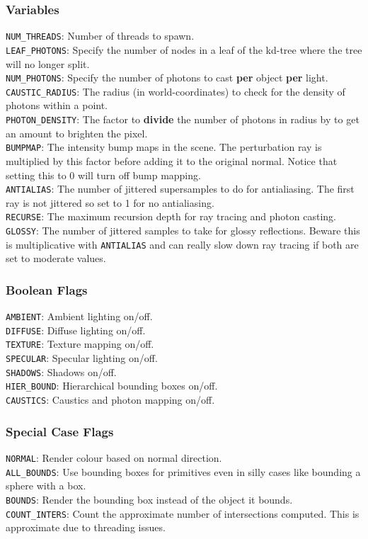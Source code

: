 \documentclass {article}
\begin{document}
\subsubsection{Variables}
\verb!NUM_THREADS!: Number of threads to spawn.\\
\verb!LEAF_PHOTONS!: Specify the number of nodes in a leaf of the kd-tree
where the tree will no longer split.\\
\verb!NUM_PHOTONS!: Specify the number of photons to cast \textbf{per} object
\textbf{per} light.\\
\verb!CAUSTIC_RADIUS!: The radius (in world-coordinates) to check for the
density of photons within a point.\\
\verb!PHOTON_DENSITY!: The factor to \textbf{divide} the number of photons in
radius by to get an amount to brighten the pixel.\\
\verb!BUMPMAP!: The intensity bump maps in the scene.  The perturbation ray is
multiplied by this factor before adding it to the original normal.  Notice that
setting this to 0 will turn off bump mapping.\\
\verb!ANTIALIAS!: The number of jittered supersamples to do for antialiasing.
The first ray is not jittered so set to 1 for no antialiasing.\\
\verb!RECURSE!: The maximum recursion depth for ray tracing and photon
casting.\\
\verb!GLOSSY!: The number of jittered samples to take for glossy reflections.
Beware this is multiplicative with \verb!ANTIALIAS! and can really slow down ray
tracing if both are set to moderate values.\\

\subsubsection{Boolean Flags}
\verb!AMBIENT!: Ambient lighting on/off.\\
\verb!DIFFUSE!: Diffuse lighting on/off.\\
\verb!TEXTURE!: Texture mapping on/off.\\
\verb!SPECULAR!: Specular lighting on/off.\\
\verb!SHADOWS!: Shadows on/off.\\
\verb!HIER_BOUND!: Hierarchical bounding boxes on/off.\\
\verb!CAUSTICS!: Caustics and photon mapping on/off.\\

\subsubsection{Special Case Flags}
\verb!NORMAL!: Render colour based on normal direction.\\
\verb!ALL_BOUNDS!: Use bounding boxes for primitives even in silly cases like
bounding a sphere with a box.\\
\verb!BOUNDS!: Render the bounding box instead of the object it bounds.\\
\verb!COUNT_INTERS!: Count the approximate number of intersections computed.
This is approximate due to threading issues.\\
\end{document}
